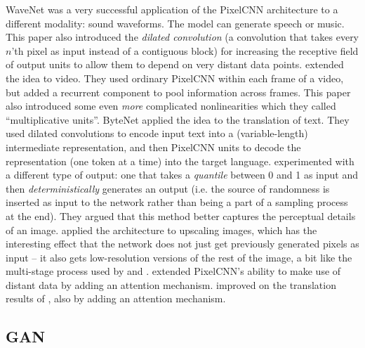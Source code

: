 \documentclass[11pt, a4paper, openany]{book}
\newcommand{\nquote}[1]{``{#1}''}
\begin{document}
WaveNet \citep{wavenet} was a very successful application of the PixelCNN architecture to a different modality: sound waveforms. The model can generate speech or music. This paper also introduced the \emph{dilated convolution} (a convolution that takes every $n$'th pixel as input instead of a contiguous block) for increasing the receptive field of output units to allow them to depend on very distant data points. \citet{videopixel} extended the idea to video. They used ordinary PixelCNN within each frame of a video, but added a recurrent component to pool information across frames. This paper also introduced some even \emph{more} complicated nonlinearities which they called \nquote{multiplicative units}. ByteNet \citep{bytenet} applied the idea to the translation of text. They used dilated convolutions to encode input text into a (variable-length) intermediate representation, and then PixelCNN units to decode the representation (one token at a time) into the target language. \citet{quantile} experimented with a different type of output: one that takes a \emph{quantile} between 0 and 1 as input and then \emph{deterministically} generates an output (i.e. the source of randomness is inserted as input to the network rather than being a part of a sampling process at the end). They argued that this method better captures the perceptual details of an image. \citet{superres} applied the architecture to upscaling images, which has the interesting effect that the network does not just get previously generated pixels as input -- it also gets low-resolution versions of the rest of the image, a bit like the multi-stage process used by \citet{pixelcnn1} and \citet{auxiliary}. \citet{pixelsnail} extended PixelCNN's ability to make use of distant data by adding an attention mechanism. \citet{fbtranslate} improved on the translation results of \citet{bytenet}, also by adding an attention mechanism.

\subsection{GAN}
\end{document}
